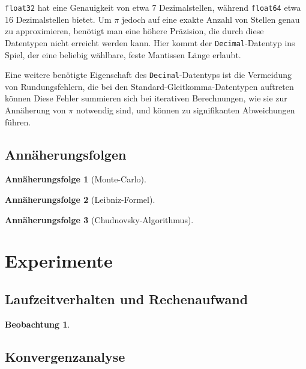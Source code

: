 \documentclass{scrartcl}
\newtheorem{approximation sequence}{Annäherungsfolge}
\newtheorem{observation}{Beobachtung}
\begin{document}
\texttt{float32} hat eine Genauigkeit von etwa 7 Dezimalstellen, während
\texttt{float64} etwa 16 Dezimalstellen bietet.
Um \(\pi\) jedoch auf eine exakte Anzahl von Stellen genau zu approximieren,
benötigt man eine höhere Präzision, die durch diese Datentypen nicht erreicht
werden kann.
Hier kommt der \texttt{Decimal}-Datentyp ins Spiel, der eine beliebig wählbare,
feste Mantissen Länge erlaubt.

Eine weitere benötigte Eigenschaft des \texttt{Decimal}-Datentyps ist die
Vermeidung von Rundungsfehlern, die bei den Standard-Gleitkomma-Datentypen
auftreten können Diese Fehler summieren sich bei iterativen Berechnungen, wie
sie zur Annäherung von \(\pi\) notwendig sind, und können zu signifikanten
Abweichungen führen.

\subsection{Annäherungsfolgen}

\begin{approximation sequence}[Monte-Carlo]

\end{approximation sequence}

\begin{approximation sequence}[Leibniz-Formel]

\end{approximation sequence}

\begin{approximation sequence}[Chudnovsky-Algorithmus]

\end{approximation sequence}

\section{Experimente}

\subsection{Laufzeitverhalten und Rechenaufwand}

\begin{observation}

\end{observation}

\subsection{Konvergenzanalyse}
\end{document}
